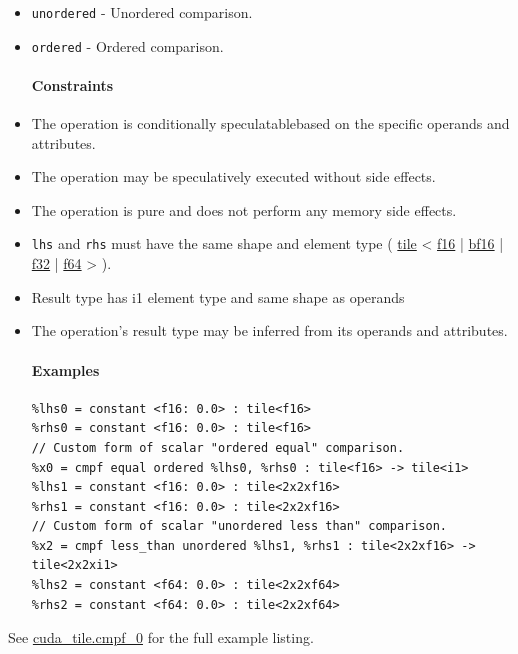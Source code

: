\documentclass{article}
\begin{document}
\begin{itemize}
\item \texttt{unordered} - Unordered comparison.
\item \texttt{ordered} - Ordered comparison.


\paragraph{Constraints}

\item The operation is conditionally speculatablebased on the specific operands and attributes.
\item The operation may be speculatively executed without side effects.
\item The operation is pure and does not perform any memory side effects.
\item \texttt{lhs} and \texttt{rhs} must have the same shape and element type ( \href{https://docs.nvidia.com/cuda/tile-ir/latest/sections/types.html#type-tile}{tile} < \href{https://docs.nvidia.com/cuda/tile-ir/latest/sections/types.html#subsection-element-types}{f16} | \href{https://docs.nvidia.com/cuda/tile-ir/latest/sections/types.html#subsection-element-types}{bf16} | \href{https://docs.nvidia.com/cuda/tile-ir/latest/sections/types.html#subsection-element-types}{f32} | \href{https://docs.nvidia.com/cuda/tile-ir/latest/sections/types.html#subsection-element-types}{f64} > ).
\item Result type has i1 element type and same shape as operands
\item The operation's result type may be inferred from its operands and attributes.


\paragraph{Examples}

\begin{lstlisting}
%lhs0 = constant <f16: 0.0> : tile<f16>
%rhs0 = constant <f16: 0.0> : tile<f16>
// Custom form of scalar "ordered equal" comparison.
%x0 = cmpf equal ordered %lhs0, %rhs0 : tile<f16> -> tile<i1>
%lhs1 = constant <f16: 0.0> : tile<2x2xf16>
%rhs1 = constant <f16: 0.0> : tile<2x2xf16>
// Custom form of scalar "unordered less than" comparison.
%x2 = cmpf less_than unordered %lhs1, %rhs1 : tile<2x2xf16> -> tile<2x2xi1>
%lhs2 = constant <f64: 0.0> : tile<2x2xf64>
%rhs2 = constant <f64: 0.0> : tile<2x2xf64>
\end{lstlisting}

\end{itemize}
See \href{https://docs.nvidia.com/cuda/tile-ir/latest/sections/appendix.html#example-cuda-tile-cmpf-0}{cuda\_tile.cmpf\_0} for the full example listing.
\end{document}
